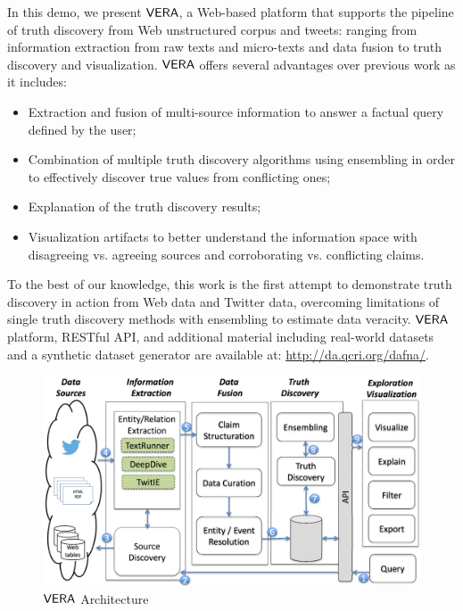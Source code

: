 In this demo, we present $\mathsf{VERA}$, a Web-based platform that supports the pipeline of truth discovery from Web unstructured corpus and tweets: ranging from information extraction from raw texts and micro-texts and data fusion to truth discovery and visualization. $\mathsf{VERA}$ offers several advantages over previous work as it includes: 
\renewcommand{\labelitemi}{$-$}
\begin{itemize}
\item Extraction and fusion of multi-source information to answer a factual query defined by the user;
\item Combination of multiple truth discovery algorithms using  ensembling in order to effectively discover true values from conflicting ones;
\item Explanation of the truth discovery results;
\item Visualization artifacts to better understand the information space with disagreeing vs. agreeing sources and corroborating vs. conflicting claims.
\end{itemize}


 To the best of our knowledge, this work is the first attempt to demonstrate truth discovery in action from Web data and Twitter data, overcoming limitations of single truth discovery methods with ensembling to estimate data veracity. $\mathsf{VERA}$ platform, RESTful API, and additional material including real-world datasets and a synthetic dataset generator are available at:  {\url{http://da.qcri.org/dafna/}}.


\begin{figure}[t]
 \begin{center}
  \includegraphics[width=.98\linewidth]{fig1.png}
   \end{center}
\label{archi}\caption{$\mathsf{VERA}$ Architecture }
\end{figure}
